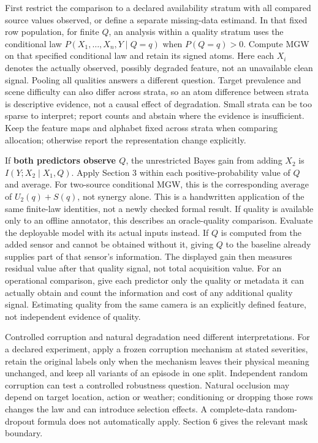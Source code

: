 \documentclass[11pt,a4paper]{article}
\begin{document}
First restrict the comparison to a declared availability stratum with all compared source values observed, or define a separate missing-data estimand. In that fixed row population, for finite \(Q\), an analysis within a quality stratum uses the conditional law \(P(X_1,\ldots,X_n,Y\mid Q=q)\) when \(P(Q=q)>0\). Compute MGW on that specified conditional law and retain its signed atoms. Here each \(X_i\) denotes the actually observed, possibly degraded feature, not an unavailable clean signal. Pooling all qualities answers a different question. Target prevalence and scene difficulty can also differ across strata, so an atom difference between strata is descriptive evidence, not a causal effect of degradation. Small strata can be too sparse to interpret; report counts and abstain where the evidence is insufficient. Keep the feature maps and alphabet fixed across strata when comparing allocation; otherwise report the representation change explicitly.

If \textbf{both predictors observe \(Q\)}, the unrestricted Bayes gain from adding \(X_2\) is \(I(Y;X_2\mid X_1,Q)\). Apply Section 3 within each positive-probability value of \(Q\) and average. For two-source conditional MGW, this is the corresponding average of \(U_2(q)+S(q)\), not synergy alone. This is a handwritten application of the same finite-law identities, not a newly checked formal result. If quality is available only to an offline annotator, this describes an oracle-quality comparison. Evaluate the deployable model with its actual inputs instead. If \(Q\) is computed from the added sensor and cannot be obtained without it, giving \(Q\) to the baseline already supplies part of that sensor's information. The displayed gain then measures residual value after that quality signal, not total acquisition value. For an operational comparison, give each predictor only the quality or metadata it can actually obtain and count the information and cost of any additional quality signal. Estimating quality from the same camera is an explicitly defined feature, not independent evidence of quality.

Controlled corruption and natural degradation need different interpretations. For a declared experiment, apply a frozen corruption mechanism at stated severities, retain the original labels only when the mechanism leaves their physical meaning unchanged, and keep all variants of an episode in one split. Independent random corruption can test a controlled robustness question. Natural occlusion may depend on target location, action or weather; conditioning or dropping those rows changes the law and can introduce selection effects. A complete-data random-dropout formula does not automatically apply. Section 6 gives the relevant mask boundary.
\end{document}
